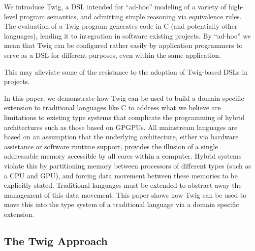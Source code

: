 We introduce Twig, a DSL intended for ``ad-hoc'' modeling of a variety of
high-level program semantics, and admitting simple reasoning via equivalence
rules. The evaluation of a Twig program generates code in C (and potentially
other languages), lending it to integration in software existing projects. By
``ad-hoc'' we mean that Twig can be configured rather easily by application
programmers to serve as a DSL for different purposes, even within the same
application. 


This may alleviate some of the resistance to the adoption of Twig-based DSLs
in projects.

In this paper, we demonstrate how Twig can be used to build a domain specific
extension to traditional languages like C to address what we believe are
limitations to existing type systems that complicate the programming of hybrid
architectures such as those based on GPGPUs. All mainstream languages are
based on an assumption that the underlying architecture, either via hardware
assistance or software runtime support, provides the illusion of a single
addressable memory accessible by all cores within a computer. Hybrid systems
violate this by partitioning memory between processors of different types
(such as a CPU and GPU), and forcing data movement between these memories to
be explicitly stated. Traditional languages must be extended to abstract away
the management of this data movement. This paper shows how Twig can be used to
move this into the type system of a traditional language via a domain specific
extension. %

\subsection{The Twig Approach}
